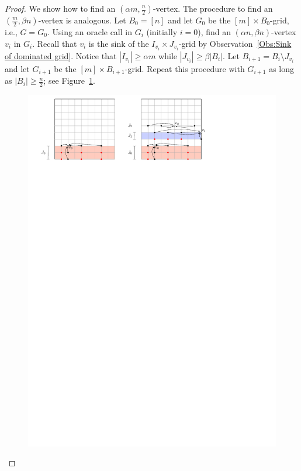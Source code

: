 \documentclass[runningheads,a4paper]{llncs}
\begin{document}
\begin{proof}
We show how to find an $(\alpha m,  \frac{n}{2})$-vertex. The procedure to find an $( \frac{m}{2}, \beta n)$-vertex is analogous.
Let $B_0 = [n]$ and let $G_0$ be the $[m]\times B_0$-grid, i.e., $G = G_0$.
Using an oracle call in $G_i$ (initially $i = 0$), find an $(\alpha n, \beta n)$-vertex $v_i$ in $G_i$. 
Recall that $v_i$ is the sink of the $I_{v_i}\times J_{v_i}$-grid by Observation~\ref{Obs:Sink of dominated grid}.
Notice that $|I_{v_i}| \geq \alpha m$ while $|J_{v_i}| \geq \beta |B_i|$.
Let $B_{i+1} = B_i\setminus J_{v_i}$ and let $G_{i+1}$ be the $[m]\times B_{i+1}$-grid. 
Repeat this procedure with $G_{i+1}$ as long as $|B_i| \geq  \frac{n}{2}$; see Figure~\ref{fig:Climbing Lemma}.

\begin{figure}[h]
\centering
\includegraphics[width=1\textwidth]{ClimbingLemma.pdf}
\caption{\small }
\label{fig:Climbing Lemma}
\end{figure}


\end{proof}
\end{document}
